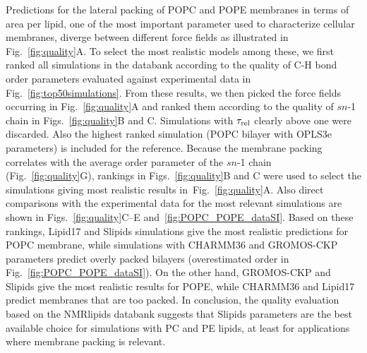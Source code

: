 \documentclass[fleqn,10pt]{wlscirep}
\begin{document}
Predictions for the lateral packing of POPC and POPE membranes in terms of area per lipid, one of the most important parameter used to characterize cellular membranes, diverge between different force fields as illustrated in Fig.~\ref{fig:quality}A. To select the most realistic models among these, we first ranked all simulations in the databank according to the quality of C-H bond order parameters evaluated against experimental data in Fig.~\ref{fig:top50simulations}. From these results, we then picked the force fields occurring in Fig.~\ref{fig:quality}A and ranked them according to the quality of $\textit{sn}$-1 chain in Figs.~\ref{fig:quality}B and C. Simulations with $\tau_{\rm rel}$ clearly above one were discarded. Also the highest ranked simulation (POPC bilayer with OPLS3e parameters) is included for the reference. Because the membrane packing correlates with the average order parameter of the $\textit{sn}$-1 chain (Fig.~\ref{fig:quality}G), rankings in Figs.~\ref{fig:quality}B and C were used to select the simulations giving most realistic results in~Fig.~\ref{fig:quality}A. Also direct comparisons with the experimental data for the most relevant simulations are shown in Figs.~\ref{fig:quality}C--E and~\ref{fig:POPC_POPE_dataSI}. Based on these rankings, Lipid17 and Slipids simulations give the most realistic predictions for POPC membrane, while simulations with CHARMM36 and GROMOS-CKP parameters predict overly packed bilayers (overestimated order in Fig.~\ref{fig:POPC_POPE_dataSI}). On the other hand, GROMOS-CKP and Slipids give the most realistic results for POPE, while CHARMM36 and Lipid17 predict membranes that are too packed. In conclusion, the quality evaluation based on the NMRlipids databank suggests that Slipids parameters are the best available choice for simulations with PC and PE lipids, at least for applications where membrane packing is relevant.
\end{document}
